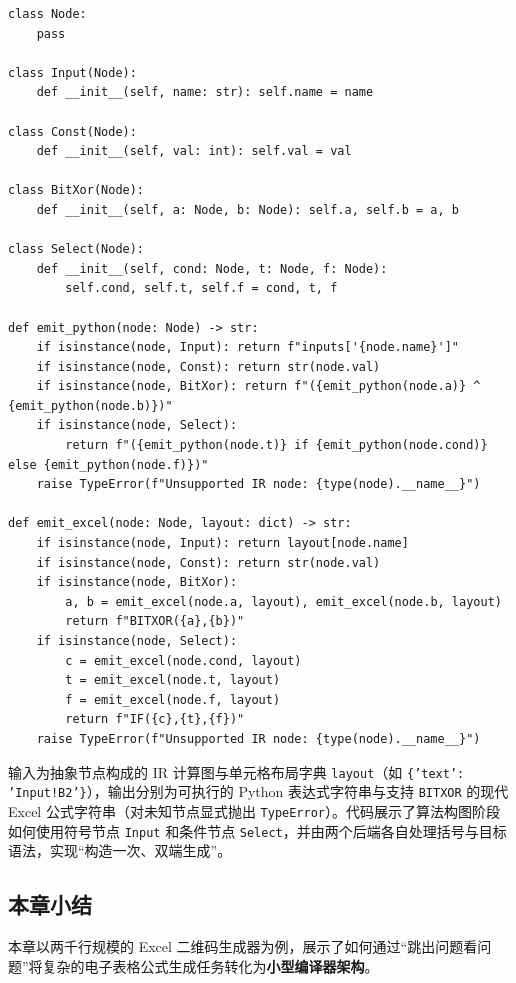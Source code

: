 \documentclass[UTF8,a4paper,11pt,fontset=fandol]{ctexart}
\begin{document}
\begin{lstlisting}[basicstyle={\ttfamily\small\linespread{1}\selectfont},captionpos=t,caption={构造中间表示（IR）并分别生成 Python 与 Excel 公式的核心机制示意}]
class Node:
    pass

class Input(Node):
    def __init__(self, name: str): self.name = name

class Const(Node):
    def __init__(self, val: int): self.val = val

class BitXor(Node):
    def __init__(self, a: Node, b: Node): self.a, self.b = a, b

class Select(Node):
    def __init__(self, cond: Node, t: Node, f: Node):
        self.cond, self.t, self.f = cond, t, f

def emit_python(node: Node) -> str:
    if isinstance(node, Input): return f"inputs['{node.name}']"
    if isinstance(node, Const): return str(node.val)
    if isinstance(node, BitXor): return f"({emit_python(node.a)} ^ {emit_python(node.b)})"
    if isinstance(node, Select):
        return f"({emit_python(node.t)} if {emit_python(node.cond)} else {emit_python(node.f)})"
    raise TypeError(f"Unsupported IR node: {type(node).__name__}")

def emit_excel(node: Node, layout: dict) -> str:
    if isinstance(node, Input): return layout[node.name]
    if isinstance(node, Const): return str(node.val)
    if isinstance(node, BitXor):
        a, b = emit_excel(node.a, layout), emit_excel(node.b, layout)
        return f"BITXOR({a},{b})"
    if isinstance(node, Select):
        c = emit_excel(node.cond, layout)
        t = emit_excel(node.t, layout)
        f = emit_excel(node.f, layout)
        return f"IF({c},{t},{f})"
    raise TypeError(f"Unsupported IR node: {type(node).__name__}")
\end{lstlisting}

输入为抽象节点构成的 IR 计算图与单元格布局字典 \texttt{layout}（如 \texttt{\{'text': 'Input!B2'\}}），输出分别为可执行的 Python 表达式字符串与支持 \texttt{BITXOR} 的现代 Excel 公式字符串（对未知节点显式抛出 \texttt{TypeError}）。代码展示了算法构图阶段如何使用符号节点 \texttt{Input} 和条件节点 \texttt{Select}，并由两个后端各自处理括号与目标语法，实现“构造一次、双端生成”。

\subsection{本章小结}

本章以两千行规模的 Excel 二维码生成器为例，展示了如何通过“跳出问题看问题”将复杂的电子表格公式生成任务转化为\textbf{小型编译器架构}。
\end{document}
